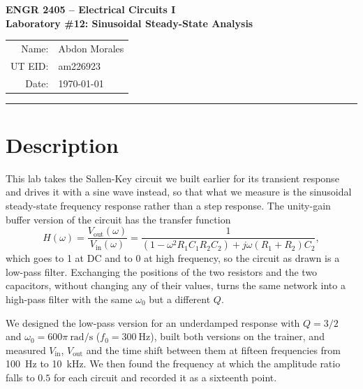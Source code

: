 \documentclass[11pt]{article}
\begin{document}
\begin{center}
    {\large\bfseries ENGR 2405 -- Electrical Circuits I}\\[2pt]
    {\large\bfseries Laboratory \#12: Sinusoidal Steady-State Analysis}\\[10pt]
    \begin{tabular}{rl}
        Name:    & Abdon Morales \\
        UT EID:  & am226923 \\
        Date:    & \today \\
    \end{tabular}
\end{center}
\vspace{0.5em}
\hrule
\vspace{1.5em}

\section*{Description}
This lab takes the Sallen-Key circuit we built earlier for its transient response
and drives it with a sine wave instead, so that what we measure is the sinusoidal
steady-state frequency response rather than a step response. The unity-gain
buffer version of the circuit has the transfer function
\[
    H(\omega) = \frac{V_{\text{out}}(\omega)}{V_{\text{in}}(\omega)}
    = \frac{1}{\left(1-\omega^{2}R_1C_1R_2C_2\right) + j\omega(R_1+R_2)C_2},
\]
which goes to 1 at DC and to 0 at high frequency, so the circuit as drawn is a
low-pass filter. Exchanging the positions of the two resistors and the two
capacitors, without changing any of their values, turns the same network into a
high-pass filter with the same $\omega_0$ but a different $Q$.

We designed the low-pass version for an underdamped response with $Q = 3/2$ and
$\omega_0 = 600\pi\ \unit{\radian\per\second}$ ($f_0 = \qty{300}{\hertz}$), built
both versions on the trainer, and measured $V_{\text{in}}$, $V_{\text{out}}$ and
the time shift between them at fifteen frequencies from \qty{100}{\hertz} to
\qty{10}{\kilo\hertz}. We then found the frequency at which the amplitude ratio
falls to $0.5$ for each circuit and recorded it as a sixteenth point.

\end{document}
